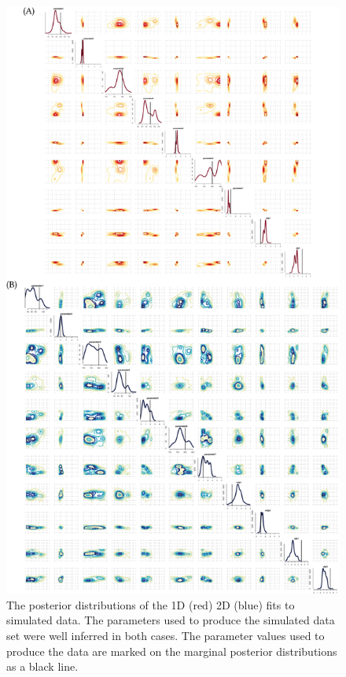 \begin{figure}[htbp]
\centering
	\includegraphics[scale=0.7]{../../chapters/chapterABCFlow/images/toy_model_posteriors.png}
	\caption[Posterior distributions of inferred parameters from simulated data]{\label{fig:1d2d-sim-post}The posterior distributions of the 1D (red) 2D (blue) fits to simulated data. The parameters used to produce the simulated data set were well inferred in both cases. The parameter values used to produce the data are marked on the marginal posterior distributions as a black line.}
\end{figure}

